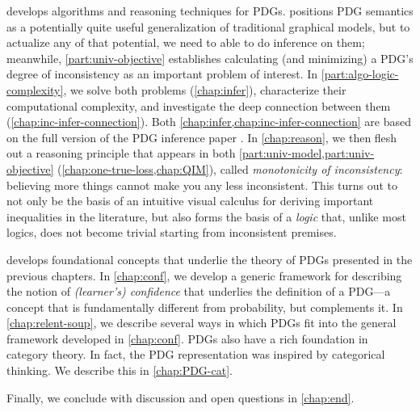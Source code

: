\textbf{}
 develops algorithms and reasoning techniques for PDGs.
 positions PDG semantics as a potentially quite useful generalization of traditional graphical models, but to actualize any of that potential, we need to able to do inference on them;
meanwhile, 
\cref{part:univ-objective} establishes calculating (and minimizing) a PDG's degree of inconsistency as an important problem of interest. 
In \cref{part:algo-logic-complexity}, we solve both problems (\cref{chap:infer}), characterize their computational complexity, and investigate the deep connection between them (\cref{chap:inc-infer-connection}). 
Both \cref{chap:infer,chap:inc-infer-connection} are based on the full version of the PDG inference paper \citep*{pdg-infer}.
In \cref{chap:reason}, we then flesh out a
    reasoning principle that appears in both \cref{part:univ-model,part:univ-objective}
    (\cref{chap:one-true-loss,chap:QIM}),
    called \emph{monotonicity of inconsistency}: 
    believing more things cannot make you any less inconsistent. 
This turns out to not only be the basis of an intuitive visual calculus for deriving important inequalities in the literature, but also forms the basis of a \emph{logic} that, unlike most logics, does not become trivial starting from inconsistent premises.


\textbf{}
 develops foundational concepts that underlie the theory of PDGs presented in the previous chapters. 
In \cref{chap:conf}, we develop a generic framework for describing the notion of \emph{(learner's) confidence} that underlies the definition of a PDG---a concept that is fundamentally different from probability, but complements it.
In \cref{chap:relent-soup}, we describe several ways in which PDGs fit into the general framework developed in \cref{chap:conf}.
PDGs also have a rich foundation in category theory.
In fact, the PDG representation was inspired by categorical thinking. 
We describe this in \cref{chap:PDG-cat}.
%

Finally, we conclude with discussion and open questions in \cref{chap:end}. 



